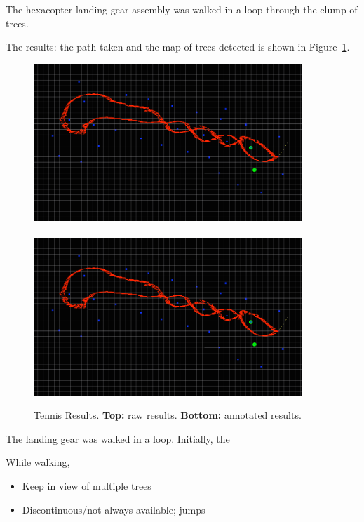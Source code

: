\documentclass[12pt,oneside,a4paper]{book}
\begin{document}
The hexacopter landing gear assembly was walked in a loop through the
clump of trees.

The results: the path taken and the map of trees detected is shown in
Figure~\ref{fig:tennis-results}. 

\begin{figure}
  \centering
  \includegraphics[width=0.9\textwidth]{figs/tennis-results}\\
  ~\\
  \includegraphics[width=0.9\textwidth]{figs/tennis-results-annotated}
  \caption{Tennis Results. \textbf{Top:} raw results. \textbf{Bottom:}
  annotated results.}
  \label{fig:tennis-results}
\end{figure}

The landing gear was walked in a loop. Initially, the 

While walking, \begin{itemize}
\item Keep in view of multiple trees
\item Discontinuous/not always available; jumps
\end{itemize}
\end{document}
